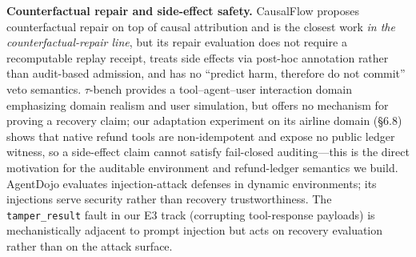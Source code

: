 \documentclass[review]{fcs}
\begin{document}
\textbf{Counterfactual repair and side-effect safety.} CausalFlow \cite{ref5} proposes counterfactual repair on top of causal attribution and is the closest work \emph{in the counterfactual-repair line}, but its repair evaluation does not require a recomputable replay receipt, treats side effects via post-hoc annotation rather than audit-based admission, and has no ``predict harm, therefore do not commit'' veto semantics. $\tau$-bench \cite{ref6} provides a tool--agent--user interaction domain emphasizing domain realism and user simulation, but offers no mechanism for proving a recovery claim; our adaptation experiment on its airline domain (\S6.8) shows that native refund tools are non-idempotent and expose no public ledger witness, so a side-effect claim cannot satisfy fail-closed auditing---this is the direct motivation for the auditable environment and refund-ledger semantics we build. AgentDojo \cite{ref7} evaluates injection-attack defenses in dynamic environments; its injections serve security rather than recovery trustworthiness. The \texttt{tamper\_result} fault in our E3 track (corrupting tool-response payloads) is mechanistically adjacent to prompt injection but acts on recovery evaluation rather than on the attack surface.
\end{document}

